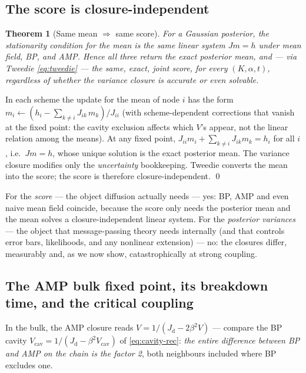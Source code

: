 \documentclass[11pt]{article}
\newtheorem{theorem}[proposition]{Theorem}
\theoremstyle{definition}
\newcommand{\Jd}{J_{\mathrm d}}
\begin{document}
\subsection{The score is closure-independent}

\begin{theorem}[Same mean $\Rightarrow$ same score]\label{thm:same-score}
For a Gaussian posterior, the stationarity condition for the mean is the
\emph{same} linear system $Jm=h$ under mean field, BP, and AMP. Hence all
three return the exact posterior mean, and --- via Tweedie
\eqref{eq:tweedie} --- the \emph{same, exact, joint score}, for every
$(K,\alpha,t)$, regardless of whether the variance closure is accurate or even
solvable.
\end{theorem}

\begin{derivation}[\ref*{thm:same-score}]
In each scheme the update for the mean of node $i$ has the form
$m_i\leftarrow(h_i-\sum_{k\ne i}J_{ik}\,m_{k})/J_{ii}$ (with
scheme-dependent corrections that vanish at the fixed point: the cavity
exclusion affects which $V$'s appear, not the linear relation among the
means). At any fixed point, $J_{ii}m_i+\sum_{k\ne i}J_{ik}m_k=h_i$ for all
$i$, i.e.\ $Jm=h$, whose unique solution is the exact posterior mean. The
variance closure modifies only the \emph{uncertainty} bookkeeping. Tweedie
converts the mean into the score; the score is therefore closure-independent.
\qed
\end{derivation}

\begin{intuition}[: why this is the precise answer to ``is AMP $=$ BP here?'']
For the \emph{score} --- the object diffusion actually needs --- yes: BP, AMP
and even naive mean field coincide, because the score only needs the
posterior mean and the mean solves a closure-independent linear system. For
the \emph{posterior variances} --- the object that message-passing theory
needs internally (and that controls error bars, likelihoods, and any
nonlinear extension) --- no: the closures differ, measurably and, as we now
show, catastrophically at strong coupling.
\end{intuition}

\subsection{The AMP bulk fixed point, its breakdown time, and the critical
coupling}

In the bulk, the AMP closure reads $V=1/(\Jd-2\beta^2V)$ --- compare the BP
cavity $V_{\mathrm{cav}}=1/(\Jd-\beta^2V_{\mathrm{cav}})$
of \eqref{eq:cavity-rec}: \emph{the entire difference between BP and AMP on
the chain is the factor 2}, both neighbours included where BP excludes one.
\end{document}
